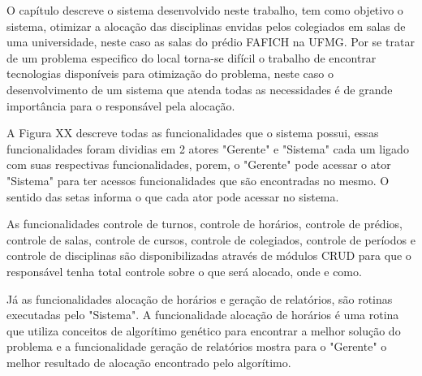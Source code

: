 

\iniciocapitulo
O capítulo descreve o sistema desenvolvido neste trabalho, tem como objetivo o sistema, otimizar a alocação das disciplinas envidas pelos colegiados em salas de uma universidade, neste caso as salas do prédio FAFICH na UFMG. Por se tratar de um problema especifico do local torna-se difícil o trabalho de encontrar tecnologias disponíveis para otimização do problema, neste caso o desenvolvimento de um sistema que atenda todas as necessidades é de grande importância para o responsável pela alocação.\par



A Figura XX descreve todas as funcionalidades que o sistema possui, essas funcionalidades foram dividias em 2 atores "Gerente" e "Sistema" cada um ligado com suas respectivas funcionalidades, porem, o "Gerente" pode acessar o ator "Sistema" para ter acessos funcionalidades que são encontradas no mesmo. O sentido das setas informa o que cada ator pode acessar no sistema.\par

As funcionalidades controle de turnos, controle de horários, controle de prédios, controle de salas, controle de cursos, controle de colegiados, controle de períodos e controle de disciplinas são disponibilizadas através de módulos CRUD para que o responsável tenha total controle sobre o que será alocado, onde e como.\par

Já as funcionalidades alocação de horários e geração de relatórios, são rotinas executadas pelo "Sistema". A funcionalidade alocação de horários é uma rotina que utiliza conceitos de algorítimo genético para encontrar a melhor solução do problema e a funcionalidade geração de relatórios mostra para o "Gerente" o melhor resultado de alocação encontrado pelo algorítimo.\par

